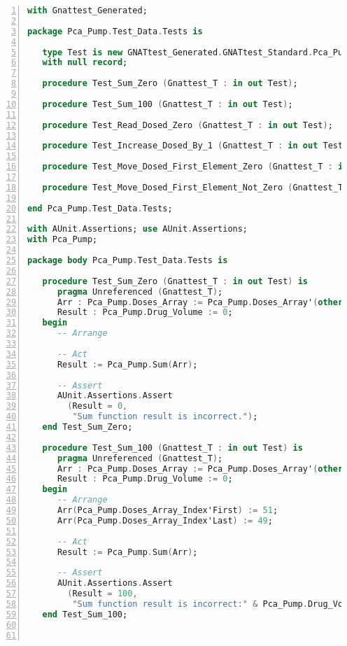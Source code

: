 \singlespacing
\begin{lstlisting}[language=ada, gobble=0, numbers=left, caption={Package \lstinline{Pca_Pump.Test_Data.Tests}}, label={listing:pcapump:dose_monitor_module:test_data_tests}]
with Gnattest_Generated;

package Pca_Pump.Test_Data.Tests is

   type Test is new GNATtest_Generated.GNATtest_Standard.Pca_Pump.Test_Data.Test
   with null record;

   procedure Test_Sum_Zero (Gnattest_T : in out Test);

   procedure Test_Sum_100 (Gnattest_T : in out Test);

   procedure Test_Read_Dosed_Zero (Gnattest_T : in out Test);

   procedure Test_Increase_Dosed_By_1 (Gnattest_T : in out Test);

   procedure Test_Move_Dosed_First_Element_Zero (Gnattest_T : in out Test);

   procedure Test_Move_Dosed_First_Element_Not_Zero (Gnattest_T : in out Test);

end Pca_Pump.Test_Data.Tests;

with AUnit.Assertions; use AUnit.Assertions;
with Pca_Pump;

package body Pca_Pump.Test_Data.Tests is

   procedure Test_Sum_Zero (Gnattest_T : in out Test) is
      pragma Unreferenced (Gnattest_T);
      Arr : Pca_Pump.Doses_Array := Pca_Pump.Doses_Array'(others => 0);
      Result : Pca_Pump.Drug_Volume := 0;
   begin
      -- Arrange

      -- Act
      Result := Pca_Pump.Sum(Arr);

      -- Assert
      AUnit.Assertions.Assert
        (Result = 0,
         "Sum function result is incorrect.");
   end Test_Sum_Zero;

   procedure Test_Sum_100 (Gnattest_T : in out Test) is
      pragma Unreferenced (Gnattest_T);
      Arr : Pca_Pump.Doses_Array := Pca_Pump.Doses_Array'(others => 0);
      Result : Pca_Pump.Drug_Volume := 0;
   begin
      -- Arrange
      Arr(Pca_Pump.Doses_Array_Index'First) := 51;
      Arr(Pca_Pump.Doses_Array_Index'Last) := 49;

      -- Act
      Result := Pca_Pump.Sum(Arr);

      -- Assert
      AUnit.Assertions.Assert
        (Result = 100,
         "Sum function result is incorrect:" & Pca_Pump.Drug_Volume'Image(Result) & " /= 100");
   end Test_Sum_100;



\end{lstlisting}
